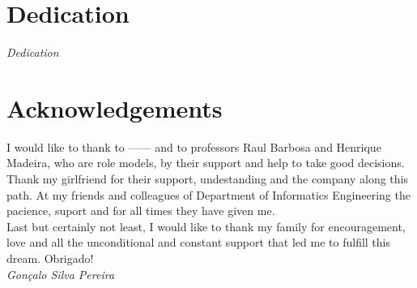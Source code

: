 
\section*{Dedication}

\emph{Dedication}


\newpage

\section*{Acknowledgements}

I would like to thank to ------ and to professors Raul Barbosa and Henrique Madeira, who are role models, by their support and help to take good decisions.\\

Thank my girlfriend for their support, undestanding and the company along this path. At my friends and colleagues of Department of Informatics Engineering the pacience, suport and for all times they have given me. \\

Last but certainly not least, I would like to thank my family for encouragement, love and all the unconditional and constant support that led me to fulfill this dream. Obrigado!\\



\emph{\hfill Gonçalo Silva Pereira}